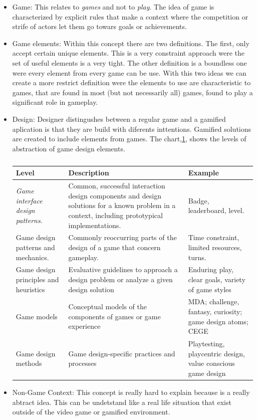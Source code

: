 \begin{itemize}

\item Game: This relates to \emph{games} and not to \emph{play}. The idea of game is
characterized by explicit rules that make a context where the competition or strife
of actors let them go towars goals or achievements.    

\item Game elements: Within this concept there are two definitions. The first,
only accept certain unique elements. This is a very constraint approach were the set
of useful elements is a very tight. The other definition is a boundless one were every
element from every game can be use. With this two ideas we can create a more restrict 
definition were the elements to use are characteristic to games, that are
found in most (but not necessarily all) games, found to play a significant role in gameplay. 

\item Design: Designer distingushes between a regular game and a gamified aplication 
is that they are build with diferents inttentions. Gamified solutions are created to 
include elements from games. The chart,\ref{Chart:Levels}, shows the levels of 
abstraction of game design elements.

\begin{table}[h]
  \footnotesize
  \begin{center}
    \begin{tabular}{ | p{5cm} | p{5cm} | p{5cm} |}
    \hline
    Level & Description &  Example \\ \hline
    \emph{Game interface design patterns}. & 
    Common, successful interaction
    design components and design
    solutions for a known problem in
    a context, including prototypical
    implementations. &
    Badge, leaderboard, level. \\ \hline
    Game design patterns and
    mechanics. & 
    Commonly reoccurring parts of
    the design of a game that concern
    gameplay. &
    Time constraint,
    limited resources,
    turns. \\ \hline
    Game design principles and
    heuristics &
    Evaluative guidelines to approach
    a design problem or
    analyze a given design solution &
    Enduring play, clear goals, variety of
    game styles \\ \hline
    Game models &
    Conceptual models of the
    components of games or game
    experience &
    MDA; challenge,
    fantasy, curiosity;
    game design atoms;
    CEGE \\ \hline
    Game design methods &
    Game design-specific practices
    and processes &
    Playtesting, playcentric design,
    value conscious game design \\ \hline
    \end{tabular}
    \caption[]{\cite{DefineGamefication}}
    \label{Chart:Levels}
  \end{center}
\end{table}

\item Non-Game Context: This concept is really hard to explain because is a really
abtract idea. This can be undetstand like a real life situation that exist  outside
 of the video game or gamified environment.

\end{itemize}

